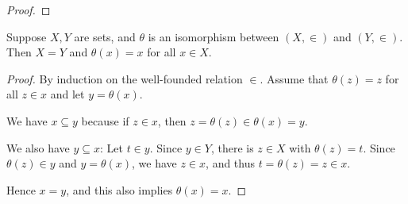 \begin{proof}
\end{proof}\begin{lemma}\label{lem-mostowski-unique}Suppose $X,Y$ are sets, and $\theta$ is an isomorphism between $(X,\in)$ and $(Y,\in)$. Then $X=Y$ and $\theta(x) = x$ for all $x \in X$.

\end{lemma}\begin{proof}By induction on the well-founded relation $\in$. Assume that $\theta(z)=z$ for all $z \in x$ and let $y = \theta(x)$.

We have $x \subseteq y$ because if $z \in x$, then $z = \theta(z) \in \theta(x) = y$.

We also have $y \subseteq x$: Let $t \in y$. Since $y \in Y$, there is $z \in X$ with $\theta(z) = t$. Since $\theta(z) \in y$ and $y = \theta(x)$, we have $z \in x$, and thus $t = \theta(z) = z \in x$.

Hence $x = y$, and this also implies $\theta(x) = x$.

\end{proof}